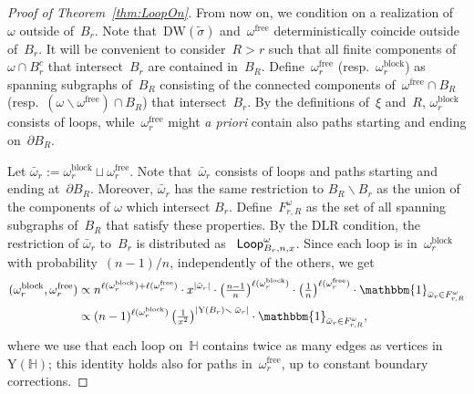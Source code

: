 \documentclass[11pt,letterpaper]{amsart}
\newcounter{n}
\numberwithin{n}{section}
\theoremstyle{plain}
\theoremstyle{definition}
\theoremstyle{remark}
\renewcommand\setminus\smallsetminus
\newcommand\muLoop{{\sf Loop}}
\newcommand\hexlattice{{\mathbb H}}
\newcommand\upvert{\mathrm{Y}} %
\newcommand{\1}{\mathbbm{1}}
\newcommand\ballloop{B}
\begin{document}
\begin{proof}[Proof of Theorem~\ref{thm:LoopOn}]
	From now on, we condition on a realization of~$\omega$ outside of~$\ballloop_r$.
	Note that~$\mathrm{DW}(\tilde{\sigma})$ and~$\omega^{\mathrm{free}}$ deterministically coincide outside of~$\ballloop_r$.
	It will be convenient to consider~$R>r$ such that all finite components of~$\omega\cap \ballloop_r^c$ that intersect~$\ballloop_r$ are contained in~$\ballloop_R$.
	Define~$\omega^{\mathrm{free}}_r$ (resp.~$\omega^{\mathrm{block}}_r$) as spanning subgraphs of~$\ballloop_R$ consisting of the connected components of~$\omega^{\mathrm{free}}\cap \ballloop_R$ (resp.~$(\omega\setminus\omega^{\mathrm{free}})\cap \ballloop_R$) that intersect~$\ballloop_r$.
	By the definitions of~$\xi$ and~$R$, $\omega^{\mathrm{block}}_r$ consists of loops, while~$\omega^{\mathrm{free}}_r$ might {\em a priori} contain also paths starting and ending on~$\partial \ballloop_R$.
	
	Let $\bar{\omega}_r := \omega^{\mathrm{block}}_r \sqcup \omega^{\mathrm{free}}_r$. 
	 Note that~$\bar{\omega}_r$ consists of loops and paths starting and ending at~$\partial\ballloop_R$. Moreover, $\bar{\omega}_r$ has the same restriction to $\ballloop_R \setminus \ballloop_r$ as the union of the components of $\omega$ which intersect $\ballloop_r$.
	Define~$F_{r,R}^{\omega}$ as the set of all spanning subgraphs of~$\ballloop_R$ that satisfy these properties.
	By the DLR condition, the restriction of $\bar{\omega}_r$ to~$\ballloop_r$ is distributed as ~$\muLoop_{\ballloop_r,n,x}^{\omega}$.
	Since each loop is in~$\omega^{\mathrm{block}}_r$ with probability~$(n-1)/n$, independently of the others, we get
	\begin{align*}
		(\omega^{\mathrm{block}}_r,\omega^{\mathrm{free}}_r)
		&\propto n^{\ell(\omega^{\mathrm{block}}_r) + \ell(\omega^{\mathrm{free}}_r)}
		\cdot x^{|\bar{\omega}_r|}
		\cdot 
		\left(\tfrac{n-1}{n}\right)^{\ell(\omega^{\mathrm{block}}_r)}
		\cdot 
		\left(\tfrac{1}{n}\right)^{\ell(\omega^{\mathrm{free}}_r)} \cdot		\1_{ \bar{\omega}_r \in F_{r,R}^{\omega} }
		\\
		&\propto
		(n-1)^{\ell(\omega^{\mathrm{block}}_r)} 
		\left(\tfrac{1}{x^2}\right)^{|\upvert(\ballloop_r)\setminus \; \bar{\omega}_r |}
		\cdot
		\1_{ \bar{\omega}_r \in F_{r,R}^{\omega} },
	\end{align*}
where we use that each loop on~$\hexlattice$ contains twice as many edges as vertices in~$\upvert(\hexlattice)$; this identity holds also for paths in~$\omega^{\mathrm{free}}_r$, up to constant boundary corrections.


\end{proof}
\end{document}
